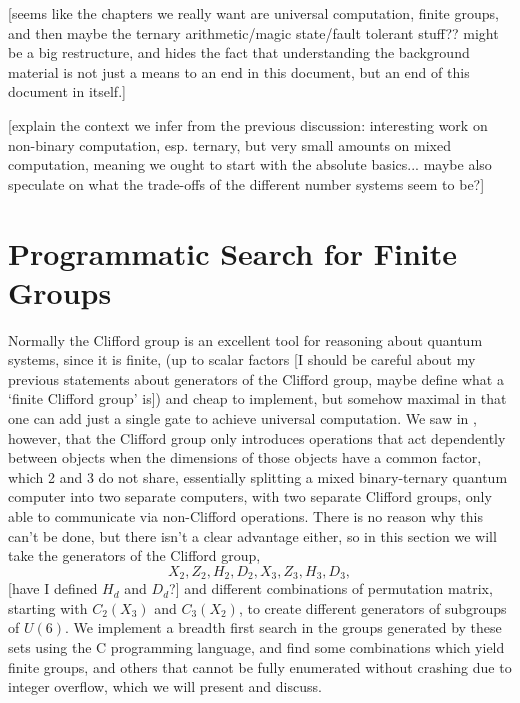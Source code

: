 [seems like the chapters we really want are universal computation, finite groups, and then maybe the ternary arithmetic/magic state/fault tolerant stuff?? might be a big restructure, and hides the fact that understanding the background material is not just a means to an end in this document, but an end of this document in itself.]

[explain the context we infer from the previous discussion: interesting work on non-binary computation, esp. ternary, but very small amounts on mixed computation, meaning we ought to start with the absolute basics... maybe also speculate on what the trade-offs of the different number systems seem to be?]

\section{Programmatic Search for Finite Groups}
Normally the Clifford group is an excellent tool for reasoning about quantum systems, since it is finite, (up to scalar factors [I should be careful about my previous statements about generators of the Clifford group, maybe define what a `finite Clifford group' is]) and cheap to implement, but somehow maximal in that one can add just a single gate to achieve universal computation. We saw in \cite{tolar-clifford}, however, that the Clifford group only introduces operations that act dependently between objects when the dimensions of those objects have a common factor, which 2 and 3 do not share, essentially splitting a mixed binary-ternary quantum computer into two separate computers, with two separate Clifford groups, only able to communicate via non-Clifford operations. There is no reason why this can't be done, but there isn't a clear advantage either, so in this section we will take the generators of the Clifford group,
\[X_2, Z_2, H_2, D_2, X_3, Z_3, H_3, D_3,\]
[have I defined $H_d$ and $D_d$?]
and different combinations of permutation matrix, starting with $C_2(X_3)$ and $C_3(X_2)$, to create different generators of subgroups of $U(6)$. We implement a breadth first search in the groups generated by these sets using the C programming language, and find some combinations which yield finite groups, and others that cannot be fully enumerated without crashing due to integer overflow, which we will present and discuss.

